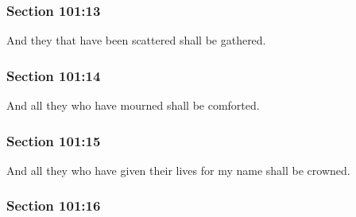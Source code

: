 	\subsubsection{Section 101:13} %
		\label{DC101-13}

		And they that have been scattered shall be gathered.


	\subsubsection{Section 101:14} %
		\label{DC101-14}

		And all they who have mourned shall be comforted.


	\subsubsection{Section 101:15} %
		\label{DC101-15}

		And all they who have given their lives for my name shall be crowned.


	\subsubsection{Section 101:16} %
		\label{DC101-16}

